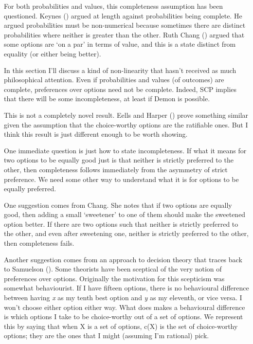\documentclass[
  11pt,
  letterpaper,
  DIV=11,
  numbers=noendperiod,
  twoside]{scrartcl}
\begin{document}
For both probabilities and values, this completeness assumption has been
questioned. Keynes () argued at length
against probabilities being complete. He argued probabilities must be
non-numerical because sometimes there are distinct probabilities where
neither is greater than the other. Ruth Chang
() argued that some options are `on a par'
in terms of value, and this is a state distinct from equality (or either
being better).

In this section I'll discuss a kind of non-linearity that hasn't
received as much philosophical attention. Even if probabilities and
values (of outcomes) are complete, preferences over options need not be
complete. Indeed, SCP implies that there will be some incompleteness, at
least if Demon is possible.

This is not a completely novel result. Eells and Harper
() prove something similar given the
assumption that the choice-worthy options are the ratifiable ones. But I
think this result is just different enough to be worth showing.

One immediate question is just how to state incompleteness. If what it
means for two options to be equally good just is that neither is
strictly preferred to the other, then completeness follows immediately
from the asymmetry of strict preference. We need some other way to
understand what it is for options to be equally preferred.

One suggestion comes from Chang. She notes that if two options are
equally good, then adding a small `sweetener' to one of them should make
the sweetened option better. If there are two options such that neither
is strictly preferred to the other, and even after sweetening one,
neither is strictly preferred to the other, then completeness fails.

Another suggestion comes from an approach to decision theory that traces
back to Samuelson (). Some theorists
have been sceptical of the very notion of preferences over options.
Originally the motivation for this scepticism was somewhat behaviourist.
If I have fifteen options, there is no behavioural difference between
having \emph{x} as my tenth best option and \emph{y} as my eleventh, or
vice versa. I won't choose either option either way. What does makes a
behavioural difference is which options I take to be choice-worthy out
of a set of options. We represent this by saying that when X is a set of
options, c(X) is the set of choice-worthy options; they are the ones
that I might (assuming I'm rational) pick.
\end{document}
